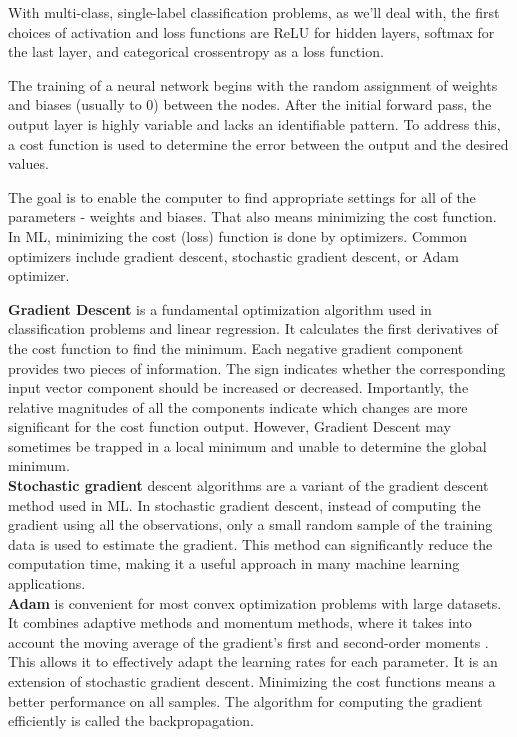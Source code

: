 With multi-class, single-label classification problems, as we'll deal with, the first choices of activation and loss functions are ReLU for hidden layers, softmax for the last layer, and categorical crossentropy as a loss function.



The training of a neural network begins with the random assignment of weights and biases (usually to 0) between the nodes. After the initial forward pass, the output layer is highly variable and lacks an identifiable pattern. To address this, a cost function is used to determine the error between the output and the desired values. 

The goal is to enable the computer to find appropriate settings for all of the parameters - weights and biases. That also means minimizing the cost function. \newline
In ML, minimizing the cost (loss) function is done by optimizers. Common optimizers include gradient descent, stochastic gradient descent, or Adam optimizer.


\textbf{Gradient Descent} is a fundamental optimization algorithm used in classification problems and linear regression. It calculates the first derivatives of the cost function to find the minimum. 
Each negative gradient component provides two pieces of information. The sign indicates whether the corresponding input vector component should be increased or decreased. Importantly, the relative magnitudes of all the components indicate which changes are more significant for the cost function output.
However, Gradient Descent may sometimes be trapped in a local minimum and unable to determine the global minimum.\\

\textbf{Stochastic gradient} descent algorithms are a variant of the gradient descent method used in ML. In stochastic gradient descent, instead of computing the gradient using all the observations, only a small random sample of the training data is used to estimate the gradient. This method can significantly reduce the computation time, making it a useful approach in many machine learning applications.\\

\textbf{Adam} is convenient for most convex optimization problems with large datasets. It combines adaptive methods and momentum methods, where it takes into account the moving average of the gradient's first and second-order moments \cite{Reyad2023}. This allows it to effectively adapt the learning rates for each parameter.
It is an extension of stochastic gradient descent.\newline
Minimizing the cost functions means a better performance on all samples. The algorithm for computing the gradient efficiently is called the backpropagation.
